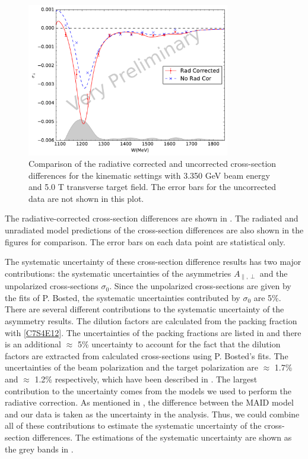 \begin{figure}[tb!]
  \centering
  \includegraphics[width=0.79\textwidth]{figs/xsdiff-model-33505090.pdf}
  \caption[Cross-section differences with $E=3.350$ GeV and $B=5.0$ T.]{Comparison of the radiative corrected and uncorrected cross-section differences for the kinematic settings with 3.350 GeV beam energy and 5.0 T transverse target field. The error bars for the uncorrected data are not shown in this plot. \label{C8S3F4}}
\end{figure}

The radiative-corrected cross-section differences are shown in . The radiated and unradiated model predictions of the cross-section differences are also shown in the figures for comparison. The error bars on each data point are statistical only.

The systematic uncertainty of these cross-section difference results has two major contributions: the systematic uncertainties of the asymmetries $A_{\parallel,\perp}$ and the unpolarized cross-sections $\sigma_0$. Since the unpolarized cross-sections are given by the fits of P. Bosted, the systematic uncertainties contributed by $\sigma_0$ are 5\%. There are several different contributions to the systematic uncertainty of the asymmetry results. The dilution factors are calculated from the packing fraction with \cref{C7S4E12}. The uncertainties of the packing fractions are listed in  and there is an additional $\approx$ 5\% uncertainty to account for the fact that the dilution factors are extracted from calculated cross-sections using P. Bosted's fits. The uncertainties of the beam polarization and the target polarization are $\approx$ 1.7\% and $\approx$ 1.2\% respectively, which have been described in . The largest contribution to the uncertainty comes from the models we used to perform the radiative correction. As mentioned in , the difference between the MAID model and our data is taken as the uncertainty in the analysis. Thus, we could combine all of these contributions to estimate the systematic uncertainty of the cross-section differences. The estimations of the systematic uncertainty are shown as the grey bands in .

